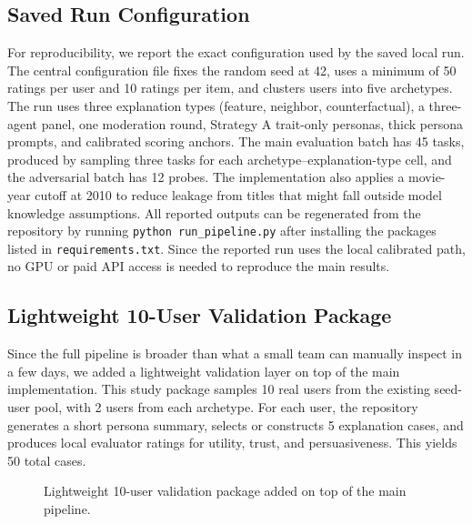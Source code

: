 \documentclass[sigconf,nonacm]{acmart}
\begin{document}
\subsection{Saved Run Configuration}

For reproducibility, we report the exact configuration used by the saved local run. The central configuration file fixes the random seed at 42, uses a minimum of 50 ratings per user and 10 ratings per item, and clusters users into five archetypes. The run uses three explanation types (feature, neighbor, counterfactual), a three-agent panel, one moderation round, Strategy A trait-only personas, thick persona prompts, and calibrated scoring anchors. The main evaluation batch has 45 tasks, produced by sampling three tasks for each archetype--explanation-type cell, and the adversarial batch has 12 probes. The implementation also applies a movie-year cutoff at 2010 to reduce leakage from titles that might fall outside model knowledge assumptions. All reported outputs can be regenerated from the repository by running \texttt{python run\_pipeline.py} after installing the packages listed in \texttt{requirements.txt}. Since the reported run uses the local calibrated path, no GPU or paid API access is needed to reproduce the main results.

\subsection{Lightweight 10-User Validation Package}

Since the full pipeline is broader than what a small team can manually inspect in a few days, we added a lightweight validation layer on top of the main implementation. This study package samples 10 real users from the existing seed-user pool, with 2 users from each archetype. For each user, the repository generates a short persona summary, selects or constructs 5 explanation cases, and produces local evaluator ratings for utility, trust, and persuasiveness. This yields 50 total cases.

\begin{figure}[t]
\centering
{}
\caption{Lightweight 10-user validation package added on top of the main pipeline.}
\label{fig:ten_user_workflow}
\end{figure}
\end{document}
